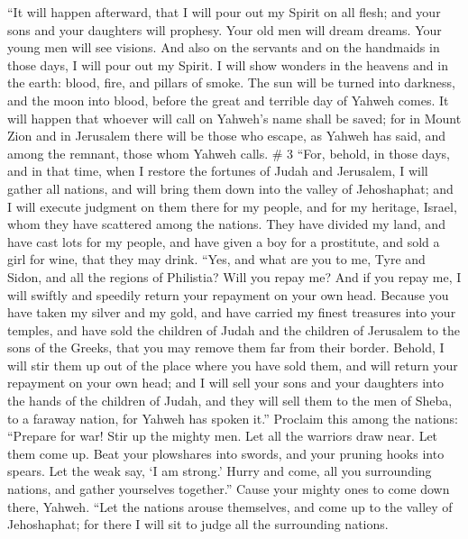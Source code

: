  ``It will happen afterward, that I will pour out my Spirit
on all flesh; and your sons and your daughters will prophesy. Your old
men will dream dreams. Your young men will see visions. 
And also on the servants and on the handmaids in those days, I will pour
out my Spirit.  I will show wonders in the heavens and in
the earth: blood, fire, and pillars of smoke.  The sun will
be turned into darkness, and the moon into blood, before the great and
terrible day of Yahweh comes.  It will happen that whoever
will call on Yahweh's name shall be saved; for in Mount Zion and in
Jerusalem there will be those who escape, as Yahweh has said, and among
the remnant, those whom Yahweh calls. \# 3  ``For, behold,
in those days, and in that time, when I restore the fortunes of Judah
and Jerusalem,  I will gather all nations, and will bring
them down into the valley of Jehoshaphat; and I will execute judgment on
them there for my people, and for my heritage, Israel, whom they have
scattered among the nations. They have divided my land,  and
have cast lots for my people, and have given a boy for a prostitute, and
sold a girl for wine, that they may drink.  ``Yes, and what
are you to me, Tyre and Sidon, and all the regions of Philistia? Will
you repay me? And if you repay me, I will swiftly and speedily return
your repayment on your own head.  Because you have taken my
silver and my gold, and have carried my finest treasures into your
temples,  and have sold the children of Judah and the
children of Jerusalem to the sons of the Greeks, that you may remove
them far from their border.  Behold, I will stir them up out
of the place where you have sold them, and will return your repayment on
your own head;  and I will sell your sons and your daughters
into the hands of the children of Judah, and they will sell them to the
men of Sheba, to a faraway nation, for Yahweh has spoken it.''
 Proclaim this among the nations: ``Prepare for war! Stir up
the mighty men. Let all the warriors draw near. Let them come up.
 Beat your plowshares into swords, and your pruning hooks
into spears. Let the weak say, `I am strong.'  Hurry and
come, all you surrounding nations, and gather yourselves together.''
Cause your mighty ones to come down there, Yahweh.  ``Let
the nations arouse themselves, and come up to the valley of Jehoshaphat;
for there I will sit to judge all the surrounding nations. 
